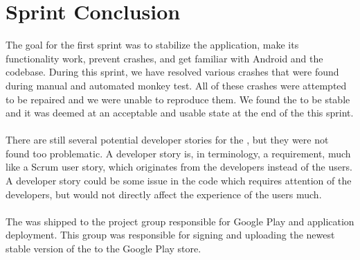 
\chapter{Sprint Conclusion}
\label{cha:conclusion_sprint_1}

The goal for the first sprint was to stabilize the \launcher application, make its functionality work, prevent crashes, and get familiar with Android and the codebase. During this sprint, we have resolved various crashes that were found during manual and automated monkey test. All of these crashes were attempted to be repaired and we were unable to reproduce them. We found the \launcher to be stable and it was deemed at an acceptable and usable state at the end of the this sprint.
\\\\
There are still several potential developer stories for the \launcher, but they were not found too problematic. A developer story is, in \giraf terminology, a requirement, much like a Scrum user story, which originates from the developers instead of the users. A developer story could be some issue in the code which requires attention of the developers, but would not directly affect the experience of the users much. 
\\\\
The \launcher was shipped to the project group responsible for Google Play and application deployment. This group was responsible for signing \parencite{android_app_signing} and uploading the newest stable version of the \launcher to the Google Play store.